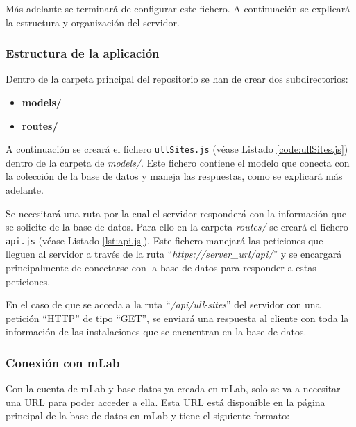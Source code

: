 Más adelante se terminará de configurar este fichero. A continuación se explicará la estructura y organización del servidor.

\subsubsection{Estructura de la aplicación}

Dentro de la carpeta principal del repositorio se han de crear dos subdirectorios:

\begin{itemize}
    \item \textbf{models/}
    \item \textbf{routes/}
\end{itemize}


A continuación se creará el fichero \texttt{ullSites.js} (véase Listado \ref{code:ullSites.js}) dentro de la carpeta de \textit{models/}. Este fichero contiene el modelo que conecta con la colección de la base de datos y maneja las respuestas, como se explicará más adelante.   


Se necesitará una ruta por la cual el servidor responderá con la información que se solicite de la base de datos. Para ello en la carpeta \textit{routes/} se creará el fichero \texttt{api.js} (véase Listado \ref{lst:api.js}). Este fichero manejará las peticiones que lleguen al servidor a través de la ruta ``\textit{https://server\_url/api/}'' y se encargará principalmente de conectarse con la base de datos para responder a estas peticiones.


En el caso de que se acceda a la ruta ``\textit{/api/ull-sites}'' del servidor con una petición ``HTTP'' de tipo ``GET'', se enviará una respuesta al cliente con toda la información de las instalaciones que se encuentran en la base de datos.

\bigskip


\subsubsection{Conexión con mLab}

Con la cuenta de mLab y base datos ya creada en mLab, solo se va a necesitar una URL para poder acceder a ella. Esta URL está disponible en la página principal de la base de datos en mLab y tiene el siguiente formato:

